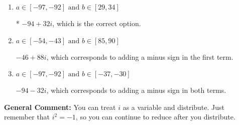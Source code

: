 \documentclass{extbook}[14pt]
\begin{document}
\begin{enumerate}
{\begin{enumerate}[label=\Alph*.]
 $-46 - 88 i$, which corresponds to adding a minus sign in the second term.
\item \( a \in [-97, -92] \text{ and } b \in [29, 34] \)

* $-94 + 32 i$, which is the correct option.
\item \( a \in [-54, -43] \text{ and } b \in [85, 90] \)

 $-46 + 88 i$, which corresponds to adding a minus sign in the first term.
\item \( a \in [-97, -92] \text{ and } b \in [-37, -30] \)

 $-94 - 32 i$, which corresponds to adding a minus sign in both terms.
\end{enumerate}

\textbf{General Comment:} You can treat $i$ as a variable and distribute. Just remember that $i^2=-1$, so you can continue to reduce after you distribute.
}
\end{enumerate}
\end{document}
